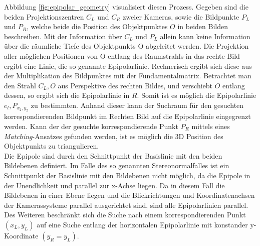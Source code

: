 \noindent
Abbildung \ref{fig:epipolar_geometry} visualisiert diesen Prozess. Gegeben sind die beiden Projektionszentren $C_L$ und $C_R$ zweier Kameras, sowie die Bildpunkte $P_L$ und $P_R$, welche beide die Position des Objektpunktes $O$ in beiden Bilden beschreiben. Mit der Information über $C_L$ und $P_L$ allein kann keine Information über die räumliche Tiefe des Objektpunkts O abgeleitet werden. Die Projektion aller möglichen Positionen von O entlang des Raumstrahls in das rechte Bild ergibt eine Linie, die so genannte Epipolarlinie. Rechnerisch ergibt sich diese aus der Multiplikation des Bildpunktes mit der Fundamentalmatrix. Betrachtet man den Strahl $C_L,O$ aus Perspektive des rechten Bildes, und verschiebt $O$ entlang dessen, so ergibt sich die Epipolarlinie in $R$. Somit ist es möglich die Epipolarlinie $e_l,P_{x_2,y_2}$ zu bestimmten. Anhand dieser kann der Suchraum für den gesuchten korrespondierenden Bildpunkt im Rechten Bild auf die Epipolarlinie eingegrenzt werden. Kann der der gesuchte korrespondierende Punkt $P_R$ mittels eines \emph{Matching}-Ansatzes gefunden werden, ist es möglich die 3D Position des Objektpunkts zu triangulieren.\\

\noindent
Die Epipole sind durch den Schnittpunkt der Basislinie mit den beiden Bildebenen definiert. Im Falle des so genannten Stereonormalfalles ist ein Schnittpunkt der Basislinie mit den Bildebenen nicht möglich, da die Epipole in der Unendlichkeit und parallel zur x-Achse liegen. Da in diesem Fall die Bildebenen in einer Ebene liegen und die Blickrichtungen und Koordinatenachsen der Kamerassysteme parallel ausgerichtet sind, sind alle Epipolarlinien parallel. Des Weiteren beschränkt sich die Suche nach einem korrespondierenden Punkt $(x_L, y_L)$ auf eine Suche entlang der horizontalen Epipolarlinie mit konstander y-Koordinate $(y_R=y_L)$.


